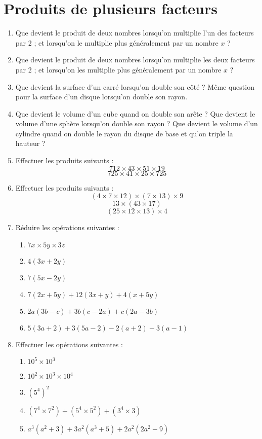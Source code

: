 
 \chapter{Produits de plusieurs facteurs}
\begin{enumerate}
\item Que devient le produit de deux nombres lorsqu'on
multiplie l'un des facteurs par 2 ; et lorsqu'on le multiplie plus généralement par un nombre $x$ ? 
\item Que devient le produit de deux nombres lorsqu'on
multiplie les deux facteurs par 2 ; et lorsqu'on les 
multiplie plus généralement par un nombre $x$ ?
\item Que devient la surface d'un carré lorsqu'on 
double son côté ? Même question pour la surface d'un
disque lorsqu'on double son rayon. 
\item Que devient le volume d'un cube quand on double
son arête ? Que devient le volume d'une sphère lorsqu'on double son rayon ? Que devient le volume d'un cylindre quand on double le rayon du disque de base et qu'on triple la hauteur ? 
\item Effectuer les produits suivants : 
\[ 712 \times 43 \times 51 \times 19\]
\[725 \times 41 \times 25 \times 725\]
\item Effectuer les produits suivants : 
\[ (4 \times 7 \times 12) \times (7 \times 13) \times 9\]
\[ 13 \times (43 \times 17)\]
\[ (25 \times 12 \times 13) \times 4\]
\item Réduire les opérations suivantes : 
\begin{enumerate}
\item $7x \times 5y \times 3z$
\item $4(3x + 2y)$
\item $7(5x - 2y)$
\item $7(2x + 5y) + 12(3x + y) + 4(x + 5y)$
\item $2a(3b - c) + 3b(c - 2a) + c(2a -3b)$
\item $5(3a + 2) + 3(5a -2) - 2(a + 2) - 3(a - 1)$
\end{enumerate}
\item Effectuer les opérations suivantes : 
\begin{enumerate}
\item $10^5\times 10^3$
\item $10^2\times 10^3 \times 10^4$
\item $(5^4)^2$
\item $(7^4 \times 7^2) + (5^4 \times 5^2) + 
(3^4 \times 3)$
\item $a^3(a^2 + 3) + 3a^2(a^3 + 5) + 2a^2( 2a^2 - 9)$

\end{enumerate}
\end{enumerate}
